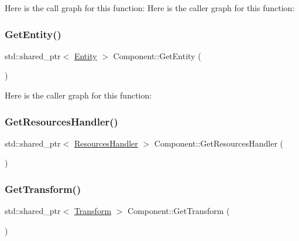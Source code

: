 Here is the call graph for this function\+:
Here is the caller graph for this function\+:
\mbox{\label{class_disc___engine_1_1_component_a746298ddfd39da5b191926aa8d8f6d95}} 
\subsubsection{\texorpdfstring{Get\+Entity()}{GetEntity()}}
{\footnotesize\ttfamily std\+::shared\+\_\+ptr$<$ \mbox{\hyperlink{class_disc___engine_1_1_entity}{Entity}} $>$ Component\+::\+Get\+Entity (\begin{DoxyParamCaption}{ }\end{DoxyParamCaption})}

Here is the caller graph for this function\+:
\mbox{\label{class_disc___engine_1_1_component_ad89e191ceda9b1e3660dce8319ef73b4}} 
\subsubsection{\texorpdfstring{Get\+Resources\+Handler()}{GetResourcesHandler()}}
{\footnotesize\ttfamily std\+::shared\+\_\+ptr$<$ \mbox{\hyperlink{class_disc___engine_1_1_resources_handler}{Resources\+Handler}} $>$ Component\+::\+Get\+Resources\+Handler (\begin{DoxyParamCaption}{ }\end{DoxyParamCaption})\hspace{0.3cm}{\ttfamily [static]}}

\mbox{\label{class_disc___engine_1_1_component_a4a2388231ae4116b35ee75793868fda6}} 
\subsubsection{\texorpdfstring{Get\+Transform()}{GetTransform()}}
{\footnotesize\ttfamily std\+::shared\+\_\+ptr$<$ \mbox{\hyperlink{class_disc___engine_1_1_transform}{Transform}} $>$ Component\+::\+Get\+Transform (\begin{DoxyParamCaption}{ }\end{DoxyParamCaption})}

